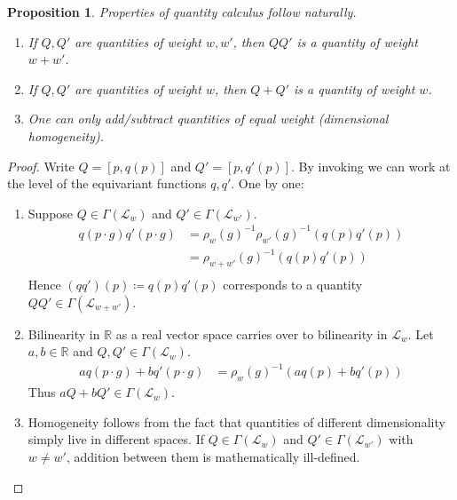 \documentclass[12pt]{article}
\numberwithin{equation}{section}
\newcommand{\R}{\mathbb{R}}
\newtheorem{proposition}[theorem]{Proposition}
\begin{document}
\begin{proposition}
    Properties of quantity calculus follow naturally.
    \begin{enumerate}[label=\alph*)]
        \item If $Q,Q'$ are quantities of weight $w,w'$, then $QQ'$ is a quantity of weight $w+w'$.
        \item If $Q,Q'$ are quantities of weight $w$, then $Q+Q'$ is a quantity of weight $w$.
        \item One can only add/subtract quantities of equal weight (dimensional homogeneity).
    \end{enumerate}
\end{proposition}
\begin{proof}
    Write $Q=[p,q(p)]$ and $Q'=[p,q'(p)]$. By invoking  we can work at the level of the equivariant functions $q,q'$. One by one:
    \begin{enumerate}[label=\alph*)]
       \item Suppose $Q\in \Gamma(\mathcal{L}_w)$ and $Q'\in \Gamma(\mathcal{L}_{w'})$.
    \begin{equation}
    \begin{split}
        q(p\cdot g) q'(p\cdot g) &= \rho_w(g)^{-1}\rho_{w'}(g)^{-1} (q(p) q'(p))\\
        &= \rho_{w+w'}(g)^{-1} ( q(p) q'(p))\\
    \end{split}
    \end{equation}
    Hence $(qq')(p) \coloneqq q(p) q'(p)$ corresponds to a quantity $QQ'\in \Gamma(\mathcal{L}_{w+w'})$.
    \item Bilinearity in $\R$ as a real vector space carries over to bilinearity in $\mathcal{L}_w$. Let $a,b\in \R$ and $Q,Q'\in \Gamma(\mathcal{L}_w)$.
    \begin{equation}
    \begin{split}
        aq(p\cdot g)+bq'(p\cdot g) &= \rho_w(g)^{-1}(aq(p)+bq'(p))
    \end{split}
    \end{equation}
    Thus $aQ+bQ'\in \Gamma(\mathcal{L}_w)$.
    \item Homogeneity follows from the fact that quantities of different dimensionality simply live in different spaces. If $Q\in \Gamma(\mathcal{L}_w)$ and $Q'\in \Gamma(\mathcal{L}_{w'})$ with $w\neq w'$, addition between them is mathematically ill-defined.
    \end{enumerate}
\end{proof}
\end{document}
